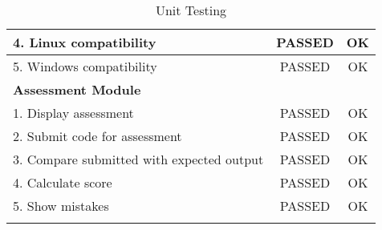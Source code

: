 \begin{longtable}[c]{|l|c|c|}
4. Linux compatibility                       & PASSED                 & OK               \\ \hline
5. Windows compatibility                     & PASSED                 & OK               \\ \hline
\multicolumn{3}{|l|}{\textbf{Assessment Module}}                                         \\ \hline
1. Display assessment                        & PASSED                 & OK               \\ \hline
2. Submit code for assessment                & PASSED                 & OK               \\ \hline
3. Compare submitted with expected output    & PASSED                 & OK               \\ \hline
4. Calculate score                           & PASSED                 & OK               \\ \hline
5. Show mistakes                             & PASSED                 & OK               \\ \hline
\caption[Unit Testing]{Unit Testing}
\end{longtable}
